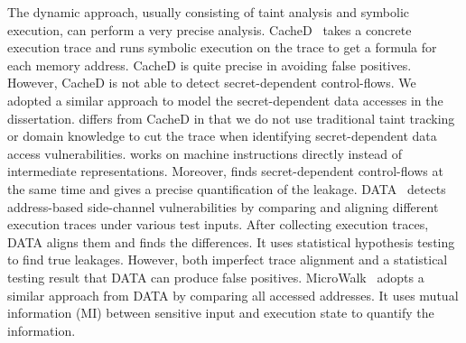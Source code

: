 The dynamic approach, usually consisting of taint analysis and symbolic execution,
can perform a very precise analysis. CacheD~\cite{203878} takes a concrete execution trace and runs symbolic execution on the trace
to get a formula for each memory address. CacheD is
quite precise in avoiding false positives. However, CacheD is not able to detect secret-dependent control-flows. We adopted a similar approach to model the secret-dependent data accesses in the dissertation. \tool{} differs from CacheD in that we do not use traditional taint tracking or domain knowledge to cut the trace when identifying secret-dependent data access vulnerabilities. \tool{} works on machine instructions directly instead of intermediate representations. Moreover, \tool{} finds secret-dependent control-flows at the same time and gives a precise quantification of the leakage. DATA~\cite{217537} detects address-based side-channel vulnerabilities by comparing and aligning different execution traces under various test inputs. After collecting execution traces, DATA aligns them and finds the differences. It uses statistical hypothesis testing to find true leakages. However, both imperfect trace alignment and a statistical testing result that DATA can produce false positives.
MicroWalk~\cite{Wichelmann:2018:MFF:3274694.3274741} adopts a similar approach from DATA by comparing all accessed addresses. It uses mutual information (MI) between sensitive input and execution state to quantify the information. 

